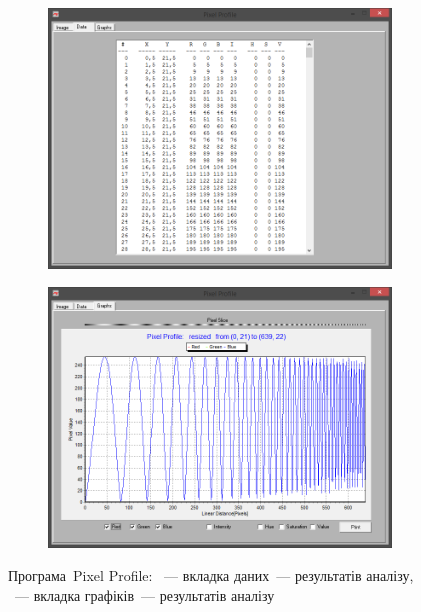 \documentclass[
	a4paper,
	oneside,
	BCOR = 10mm,
	DIV = 12,
	12pt,
	headings = normal,
]{scrartcl}
\begin{document}
		\begin{figure}[!htbp]
			\centering
			\begin{subfigure}[t]{\columnwidth / 2}
				\centering
				\includegraphics[height=10\baselineskip]{./assets/y03s02-pcdiag-lab-06-p01-pixelprofile-data.png}
				\caption{}
				\label{subfig:pixelprofile-data}
			\end{subfigure}%
			\begin{subfigure}[t]{\columnwidth / 2}
				\centering
				\includegraphics[height=10\baselineskip]{./assets/y03s02-pcdiag-lab-06-p02-pixelprofile-graphs.png}
				\caption{}
				\label{subfig:pixelprofile-graphs}
			\end{subfigure}
			\caption{Програма~\textenglish{Pixel Profile}: ~— вкладка даних~— результатів аналізу, ~— вкладка графіків~— результатів аналізу}
			\label{fig:pixelprofile}
		\end{figure}
\end{document}
